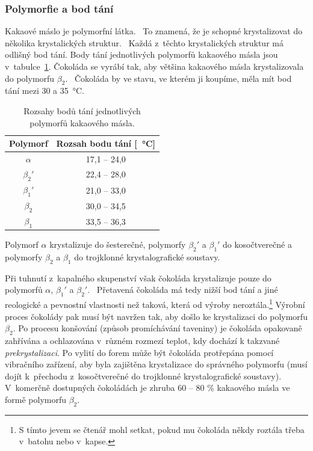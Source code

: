 \documentclass[12pt]{article}
\begin{document}
\subsubsection{Polymorfie a bod tání}%
\label{sec:polymorfie}

Kakaové máslo je polymorfní látka.~\cite{Article:cocoa_butter_polymorphism} To znamená, že je schopné krystalizovat do několika krystalických struktur.~\cite{wiki:Polymorfie} Každá z~těchto krystalických struktur má odlišný bod tání. Body tání jednotlivých polymorfů kakaového másla jsou v~tabulce~\ref{tab:polymorfy}. Čokoláda se vyrábí tak, aby většina kakaového másla krystalizovala do polymorfu $\beta_2$.~\cite{Article:cocoa_butter_tempering} Čokoláda by ve stavu, ve kterém ji koupíme, měla mít bod tání mezi 30 a \SI{35}{\degreeCelsius}.

\begin{table}[]
    \centering
    \begin{tabular}{|c|c|}
        \hline
        Polymorf & Rozsah bodu tání [\SI{}{\degreeCelsius}] \\\hline
        $\alpha$ & 17,1 -- 24,0\\
        $\beta_2'$ & 22,4 -- 28,0\\
        $\beta_1'$ & 21,0 -- 33,0\\
        $\beta_2$ & 30,0 -- 34,5\\
        $\beta_1$ & 33,5 -- 36,3\\
        \hline
    \end{tabular}
    \caption{Rozsahy bodů tání jednotlivých polymorfů kakaového másla.\cite{Article:cocoa_butter_polymorphism}}
    \label{tab:polymorfy}
\end{table}

Polymorf $\alpha$ krystalizuje do šesterečné, polymorfy $\beta_2'$ a $\beta_1'$ do kosočtverečné a polymorfy $\beta_2$ a $\beta_1$ do trojklonné krystalografické soustavy.~\cite{Article:precrystallization}\cite{wiki:crystal_structure}
\par\noindent
Při tuhnutí z~kapalného skupenství však čokoláda krystalizuje pouze do polymorfů $\alpha$, $\beta_1'$ a $\beta_2'$.~\cite{Article:molecular_polymorphism} Přetavená čokoláda má tedy nižší bod tání a jiné reologické a pevnostní vlastnosti než taková, která od výroby neroztála.\footnote{S tímto jevem se čtenář mohl setkat, pokud mu čokoláda někdy roztála třeba v~batohu nebo v~kapse.} Výrobní proces čokolády pak musí být navržen tak, aby došlo ke krystalizaci do polymorfu $\beta_2$. Po procesu konšování (způsob promíchávání taveniny) je čokoláda opakovaně zahřívána a ochlazována v~různém rozmezí teplot, kdy dochází k takzvané \emph{prekrystalizaci}. Po vylití do forem může být čokoláda protřepána pomocí vibračního zařízení, aby byla zajištěna krystalizace do správného polymorfu (musí dojít k~přechodu z~kosočtverečné do trojklonné krystalografické soustavy).~\cite{wiki:čokoláda}\cite{wiki:konšování}\cite{Article:viscosity_molten_milk_chocolate} V~komerčně dostupných čokoládách je zhruba 60 -- 80 \% kakaového másla ve formě polymorfu $\beta_2$.~\cite{Article:precrystallization}
\end{document}
